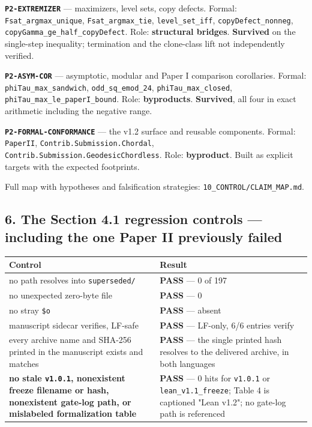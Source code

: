 \documentclass[
  9pt,
  a4paper,
]{article}
\newcounter{none} %
\begin{document}
\textbf{\texttt{P2-EXTREMIZER}} --- maximizers, level sets, copy
defects. Formal: \texttt{Fsat\_argmax\_unique},
\texttt{Fsat\_argmax\_tie}, \texttt{level\_set\_iff},
\texttt{copyDefect\_nonneg}, \texttt{copyGamma\_ge\_half\_copyDefect}.
Role: \textbf{structural bridges}. \textbf{Survived} on the single-step
inequality; termination and the clone-class lift not independently
verified.

\textbf{\texttt{P2-ASYM-COR}} --- asymptotic, modular and Paper I
comparison corollaries. Formal: \texttt{phiTau\_max\_sandwich},
\texttt{odd\_sq\_emod\_24}, \texttt{phiTau\_max\_closed},
\texttt{phiTau\_max\_le\_paperI\_bound}. Role: \textbf{byproducts}.
\textbf{Survived}, all four in exact arithmetic including the negative
range.

\textbf{\texttt{P2-FORMAL-CONFORMANCE}} --- the v1.2 surface and
reusable components. Formal: \texttt{PaperII},
\texttt{Contrib.Submission.Chordal},
\texttt{Contrib.Submission.GeodesicChordless}. Role: \textbf{byproduct}.
Built as explicit targets with the expected footprints.

Full map with hypotheses and falsification strategies:
\texttt{10\_CONTROL/CLAIM\_MAP.md}.

\subsection{6. The Section 4.1 regression controls --- including the one
Paper II previously
failed}\label{6-the-section-41-regression-controls--including-the-one-paper-ii-previously-failed}

{\def\LTcaptype{none} %
\begin{longtable}[]{@{}ll@{}}
\toprule\noalign{}
Control & Result \\
\midrule\noalign{}
\endhead
\bottomrule\noalign{}
\endlastfoot
no path resolves into \texttt{superseded/} & \textbf{PASS} --- 0 of
197 \\
no unexpected zero-byte file & \textbf{PASS} --- 0 \\
no stray \texttt{\$o} & \textbf{PASS} --- absent \\
manuscript sidecar verifies, LF-safe & \textbf{PASS} --- LF-only, 6/6
entries verify \\
every archive name and SHA-256 printed in the manuscript exists and
matches & \textbf{PASS} --- the single printed hash resolves to the
delivered archive, in both languages \\
\textbf{no stale \texttt{v1.0.1}, nonexistent freeze filename or hash,
nonexistent gate-log path, or mislabeled formalization table} &
\textbf{PASS} --- 0 hits for \texttt{v1.0.1} or
\texttt{lean\_v1.1\_freeze}; Table 4 is captioned "Lean v1.2"; no
gate-log path is referenced \\
\end{longtable}
}
\end{document}
